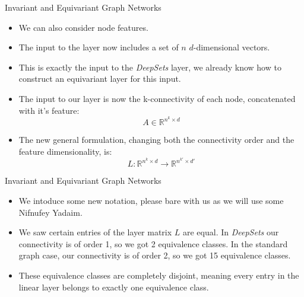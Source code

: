 \documentclass{beamer}
\begin{document}
\begin{frame}{Invariant and Equivariant Graph Networks}
    \begin{itemize}
        \setlength{\itemsep}{\fill}
        \item We can also consider node features.
        \item The input to the layer now includes a set of $n$ $d$-dimensional vectors.
        \item This is exactly the input to the \emph{DeepSets} layer, we already know how to construct an equivariant layer for this input.
        \item The input to our layer is now the k-connectivity of each node, concatenated with it's feature:
        \[ A \in \mathbb{R}^{n^k \times d} \]
        \item The new general formulation, changing both the connectivity order and the feature dimensionality, is:
        \[ L: \mathbb{R}^{n^k \times d} \rightarrow \mathbb{R}^{n^{k'} \times d'} \]
    \end{itemize}
\end{frame}
\begin{frame}{Invariant and Equivariant Graph Networks}
    \begin{itemize}
        \setlength{\itemsep}{\fill}
        \item We intoduce some new notation, please bare with us as we will use some Nifnufey Yadaim.
        \item We saw certain entries of the layer matrix $L$ are equal.
        In \emph{DeepSets} our connectivity is of order 1, so we got 2 equivalence classes.
        In the standard graph case, our connectivity is of order 2, so we got 15 equivalence classes.
        \item These equivalence classes are completely disjoint, meaning every entry in the linear layer belongs to exactly one equivalence class.
    \end{itemize}
\end{frame}
\end{document}
